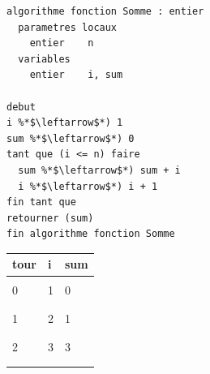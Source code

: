 \documentclass[11pt,a4paper]{article}
\begin{document}
\begin{table}[!ht]
  \centering
  \begin{minipage}{0.59\textwidth}
    \centering
\begin{lstlisting}[style=algorithmique]
algorithme fonction Somme : entier
  parametres locaux
    entier    n
  variables
    entier    i, sum

debut
i %*$\leftarrow$*) 1
sum %*$\leftarrow$*) 0
tant que (i <= n) faire
  sum %*$\leftarrow$*) sum + i
  i %*$\leftarrow$*) i + 1
fin tant que
retourner (sum)
fin algorithme fonction Somme \end{lstlisting}
  \end{minipage}
  \hfillx
  \begin{minipage}{0.4\textwidth}
    \centering
    \begin{tabular}{|C{1cm}|C{1cm}|C{1cm}|}
        \hline
        tour &  i &  sum  \\
        \hline
             &    &       \\
        0    &  1 &  0    \\
             &    &       \\
        \hline
             &    &       \\
        1    &  2 &  1    \\
             &    &       \\
        \hline
             &    &       \\
        2    &  3 &  3    \\
             &    &       \\
        \hline
             &    &       \\

\end{tabular}
\end{minipage}
\end{table}
\end{document}
